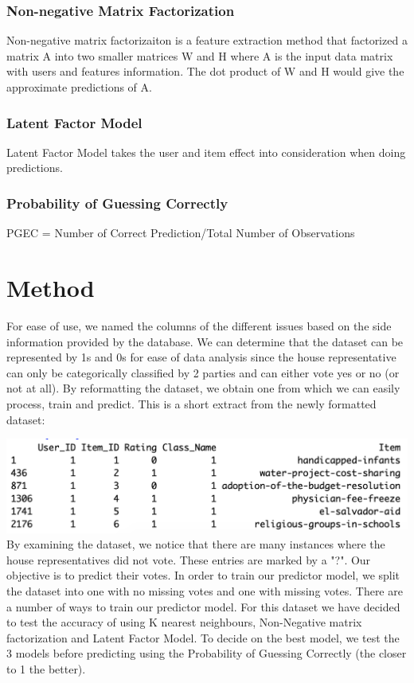 \documentclass{article}
\begin{document}
\subsubsection{Non-negative Matrix Factorization}
Non-negative matrix factorizaiton is a feature extraction method that 
factorized a matrix A into two smaller matrices W and H where A is the
input data matrix with users and features information. The 
dot product of W and H would give the approximate predictions of A. 

\subsubsection{Latent Factor Model}
Latent Factor Model takes the user and item effect into consideration when doing predictions. 

\subsubsection{Probability of Guessing Correctly}
PGEC = Number of Correct Prediction/Total Number of Observations \newline

\section{Method}

For ease of use, we named the columns of 
the different issues based on the side information provided by the database.
We can determine that the dataset can be represented by 1s and 0s for ease of data analysis
since the house representative can only be categorically classified by 2 parties and can either vote
yes or no (or not at all).
By reformatting the dataset, we obtain one from which we can easily process, train and 
predict. This is a short extract from the newly formatted dataset:

\includegraphics[scale=0.6]{raw_data_example.png}
\linebreak
By examining the dataset, we notice that there are many instances where the
house representatives did not vote. These entries are marked by a "?". Our objective
is to predict their votes. In order to train our predictor model, we split the dataset
into one with no missing votes and one with missing votes.
There are a number of ways to train our predictor model. For this dataset we have
decided to test the accuracy of using K nearest neighbours, Non-Negative matrix 
factorization and Latent Factor Model. To decide on the best model, we test the 3 models before predicting using the Probability of Guessing Correctly (the closer to
1 the better). 
\end{document}
